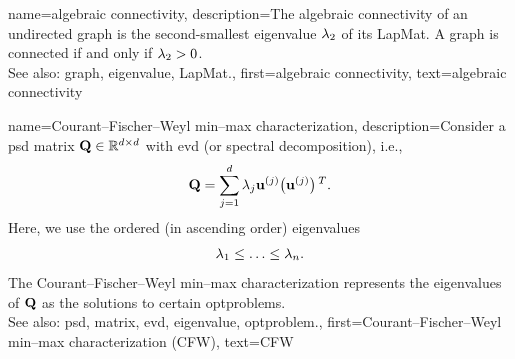 {name={algebraic connectivity},
	description={The algebraic connectivity of an undirected \gls{graph} 
		is the second-smallest \gls{eigenvalue} $\lambda_{2}$ of its \gls{LapMat}. A \gls{graph} is connected if and only if 
		$\lambda_{2} >0$. 
				\\
		See also: \gls{graph}, \gls{eigenvalue}, \gls{LapMat}.},
	first={algebraic connectivity},
	text={algebraic connectivity}
}


{name={Courant–Fischer–Weyl min–max characterization}, 
	description={Consider a \gls{psd} 
		\gls{matrix} $\mathbf{Q} \in \mathbb{R}^{d \times d}$ with 
		\gls{evd} (or spectral decomposition), i.e.,
		$$\mathbf{Q} = \sum_{j=1}^{d} \lambda_{j} {\bf u}^{(j)} \big(  {\bf u}^{(j)}  \big)\,^{T}.$$ 
		Here, we use the ordered (in ascending order) \glspl{eigenvalue} 
		\begin{equation}
			\nonumber
		 	\lambda_{1}  \leq \ldots \leq \lambda_{n}. 
		\end{equation}
		The Courant–Fischer–Weyl min–max characterization \cite[Th. 8.1.2]{GolubVanLoanBook} 
		represents the \glspl{eigenvalue} of $\mathbf{Q}$ as the solutions to certain \glspl{optproblem}.
			\\
		See also: \gls{psd}, \gls{matrix}, \gls{evd}, \gls{eigenvalue}, \gls{optproblem}.}, 
	first={Courant–Fischer–Weyl min–max characterization (CFW)}, 
	text={CFW}
}


